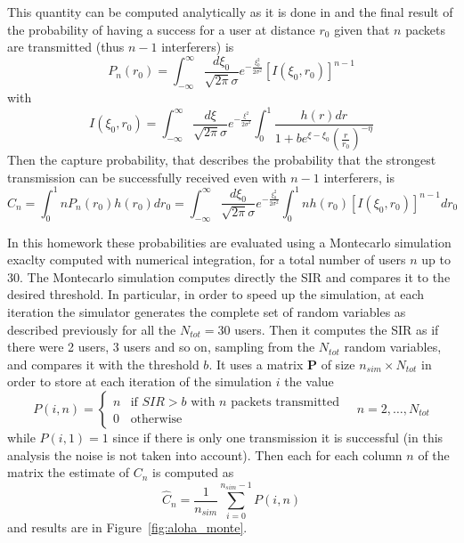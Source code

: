 \documentclass[10pt]{article}
\begin{document}
This quantity can be computed analytically as it is done in \cite{capture} and the final result of the probability of having a success for a user at distance $r_0$ given that $n$ packets are transmitted (thus $n-1$ interferers) is
\begin{equation}
  P_n(r_0) = \int_{-\infty}^{\infty} \frac{d\xi_0}{\sqrt{2\pi}\sigma} e^{-\frac{\xi_0^2}{2\sigma^2}}[I(\xi_0, r_0)]^{n-1}
\end{equation}
with 
\begin{equation}
  I(\xi_0, r_0) = \int_{-\infty}^{\infty} \frac{d\xi}{\sqrt{2\pi}\sigma}e^{-\frac{\xi^2}{2\sigma^2}} \int_{0}^{1} \frac{h(r) dr}{1+be^{\xi - \xi_0}\left(\frac{r}{r_0}\right)^{-\eta}}
  \label{eq:I}
\end{equation}
Then the capture probability, that describes the probability that the strongest transmission can be successfully received even with $n-1$ interferers, is
\begin{equation}
  C_n = \int_0^1 nP_n(r_0)h(r_0) dr_0 = \int_{-\infty}^{\infty} \frac{d\xi_0}{\sqrt{2\pi}\sigma} e^{-\frac{\xi_0^2}{2\sigma^2}} \int_0^1 n h(r_0) [I(\xi_0, r_0)]^{n-1} dr_0
  \label{eq:cn}
\end{equation}

In this homework these probabilities are evaluated using a Montecarlo simulation exaclty computed with numerical integration, for a total number of users $n$ up to 30. The Montecarlo simulation computes directly the SIR and compares it to the desired threshold. In particular, in order to speed up the simulation, at each iteration the simulator generates the complete set of random variables as described previously for all the $N_{tot} = 30$ users. Then it computes the SIR as if there were 2 users, 3 users and so on, sampling from the $N_{tot}$ random variables, and compares it with the threshold $b$. It uses a matrix $\mathbf{P}$ of size $n_{sim} \times N_{tot}$ in order to store at each iteration of the simulation $i$ the value
\begin{equation}
P(i, n) = 
\begin{cases}
  n & \mbox{if } SIR > b \mbox{ with } n \mbox{ packets transmitted}\\
  0 & \mbox{otherwise}
\end{cases}
 \quad n = 2, \dots, N_{tot}
\end{equation}
while $P(i, 1) = 1$ since if there is only one transmission it is successful (in this analysis the noise is not taken into account).
Then each for each column $n$ of the matrix the estimate of $C_n$ is computed as
\begin{equation}
  \hat{C}_n = \frac{1}{n_{sim}} \sum_{i = 0}^{n_{sim} - 1} P(i, n)
\end{equation}
and results are in Figure~\ref{fig:aloha_monte}.
\end{document}
